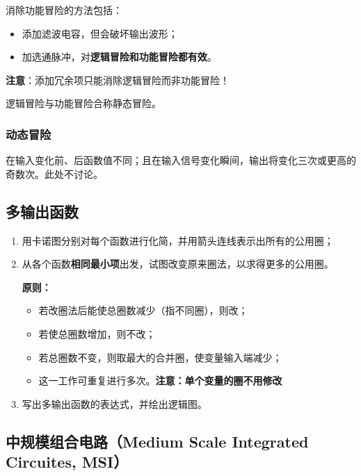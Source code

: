 \documentclass[UTF8,fontset=fandol,zihao=5]{ctexart}
\begin{document}
消除功能冒险的方法包括：
\begin{itemize}
  \item 添加滤波电容，但会破坏输出波形；
  \item 加选通脉冲，对\textbf{逻辑冒险和功能冒险都有效}。
\end{itemize}

\begin{methodbox}
  \textbf{注意}：添加冗余项只能消除逻辑冒险而非功能冒险！
\end{methodbox}

逻辑冒险与功能冒险合称静态冒险。

\subsubsection{动态冒险}

在输入变化前、后函数值不同；且在输入信号变化瞬间，输出将变化三次或更高的奇数次。此处不讨论。

\subsection{多输出函数}
\begin{enumerate}
  \item 用卡诺图分别对每个函数进行化简，并用箭头连线表示出所有的公用圈；
  
  \item 从各个函数\textbf{相同最小项}出发，试图改变原来圈法，以求得更多的公用圈。

  \textbf{原则：}

  \begin{itemize}
    \item 若改圈法后能使总圈数减少（指不同圈），则改；
    \item 若使总圈数增加，则不改；
    \item 若总圈数不变，则取最大的合并圈，使变量输入端减少；
    \item 这一工作可重复进行多次。\textbf{注意：单个变量的圈不用修改}
  \end{itemize}

  \item 写出多输出函数的表达式，并绘出逻辑图。
\end{enumerate}

\subsection{中规模组合电路（Medium Scale Integrated Circuites, MSI）}
\end{document}
